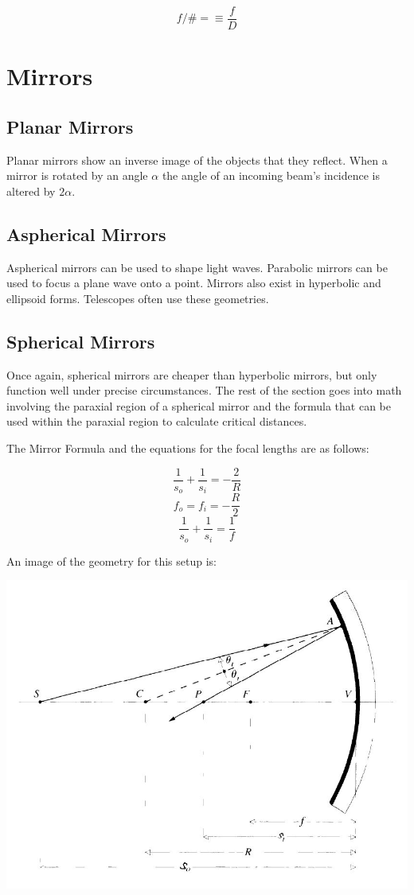 \documentclass[12pt]{report}
\begin{document}
\[f/\# = \equiv \frac{f}{D}\]

\section{Mirrors}
\subsection{Planar Mirrors}
Planar mirrors show an inverse image of the objects that they reflect. When a mirror is rotated by an angle $\alpha$ the angle of an incoming beam's incidence is altered by $2\alpha$.

\subsection{Aspherical Mirrors}
Aspherical mirrors can be used to shape light waves. Parabolic mirrors can be used to focus a plane wave onto a point. Mirrors also exist in hyperbolic and ellipsoid forms. Telescopes often use these geometries. 
\subsection{Spherical Mirrors}
Once again, spherical mirrors are cheaper than hyperbolic mirrors, but only function well under precise circumstances. The rest of the section goes into math involving the paraxial region of a spherical mirror and the formula that can be used within the paraxial region to calculate critical distances.

The Mirror Formula and the equations for the focal lengths are as follows:

\begin{equation}
\frac{1}{s_o}+\frac{1}{s_i} = -\frac{2}{R}
\end{equation}
\begin{equation}
f_o = f_i = -\frac{R}{2} 
\end{equation}
\begin{equation}
\frac{1}{s_o}+\frac{1}{s_i} = \frac{1}{f}
\end{equation}


An image of the geometry for this setup is:

\includegraphics[scale=.5]{SphericalMirror.jpg}
\end{document}
